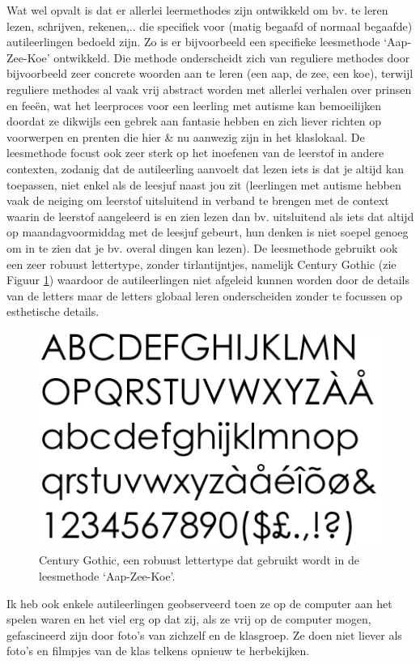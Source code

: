 \documentclass[a4paper,11pt]{article}
\theoremstyle{definition}
\begin{document}
\begin{itemize}
\begin{itemize}
\noindent Wat wel opvalt is dat 
er allerlei leermethodes zijn ontwikkeld om bv. te leren lezen, schrijven, rekenen,.. die specifiek voor (matig begaafd of normaal begaafde) autileerlingen bedoeld zijn. 
Zo is er bijvoorbeeld een specifieke leesmethode 
`Aap-Zee-Koe' ontwikkeld. Die methode onderscheidt zich van reguliere methodes 
door bijvoorbeeld zeer concrete woorden aan te leren (een aap, de zee, een koe), 
terwijl reguliere methodes al vaak vrij abstract worden met allerlei verhalen 
over prinsen en feeën, wat het leerproces voor een leerling met autisme kan bemoeilijken doordat ze dikwijls een gebrek aan fantasie hebben en zich liever richten op voorwerpen en prenten die hier \& nu aanwezig zijn in het klaslokaal. 
De leesmethode focust ook zeer sterk op het inoefenen van de leerstof in andere 
contexten, zodanig dat de autileerling aanvoelt dat lezen iets 
is dat je altijd kan toepassen, niet enkel als de leesjuf naast jou zit (leerlingen met autisme hebben vaak de neiging om leerstof uitsluitend in verband te brengen met de context waarin de leerstof aangeleerd is en zien lezen dan bv. uitsluitend als iets dat altijd op maandagvoormiddag met de leesjuf gebeurt, hun denken is niet soepel genoeg om in te zien dat je bv. overal dingen kan lezen). 
De leesmethode gebruikt ook een zeer robuust lettertype, zonder tirlantijntjes, namelijk Century 
Gothic (zie Figuur \ref{gothic}) waardoor de autileerlingen niet afgeleid kunnen worden door de details van de letters maar de letters globaal leren onderscheiden zonder te focussen op esthetische details.
\begin{figure}[h!]
  \centering
  \includegraphics[scale=0.4]{century.png}\caption{Century Gothic, een robuust lettertype dat gebruikt wordt in de leesmethode `Aap-Zee-Koe'.}\label{gothic}
\end{figure}
\noindent Ik heb ook enkele autileerlingen geobserveerd toen ze op de computer 
aan het spelen waren en het viel erg op dat zij, als ze vrij op de computer 
mogen, gefascineerd zijn door foto's van zichzelf en de klasgroep. Ze doen niet 
liever als foto's en filmpjes van de klas telkens opnieuw te herbekijken.


\end{itemize}
\end{itemize}
\end{document}
